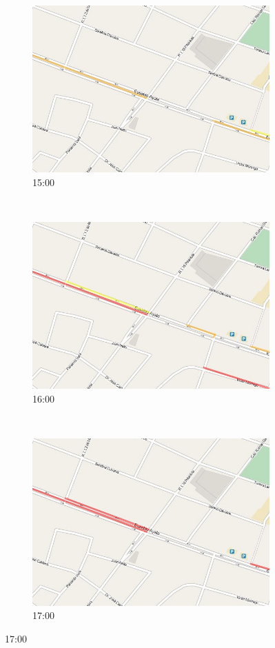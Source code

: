 \begin{figure}[!htbp]
	\begin{subfigure}[b]{0.30\textwidth}
		\includegraphics[width=\textwidth]{capitulos/7/figuras/15.jpg}
		\caption{15:00}
	\end{subfigure}
	~~
	\begin{subfigure}[b]{0.30\textwidth}
		\includegraphics[width=\textwidth]{capitulos/7/figuras/16.jpg}
		\caption{16:00}
	\end{subfigure}
	~~
	\begin{subfigure}[b]{0.30\textwidth}
		\includegraphics[width=\textwidth]{capitulos/7/figuras/17.jpg}
		\caption{17:00}
	\end{subfigure}
	

\end{figure}
